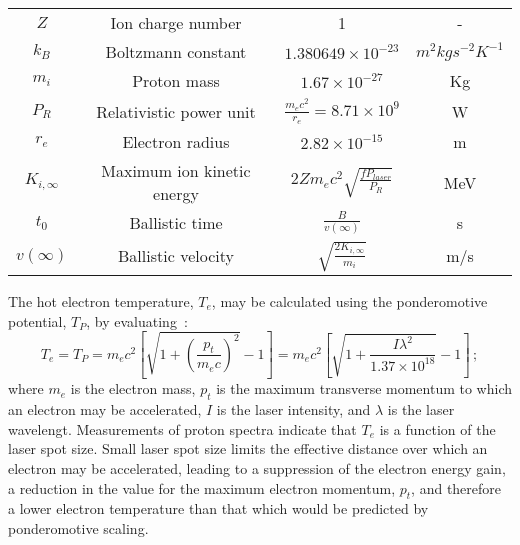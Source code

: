 \begin{table}
\begin{center}
\begin{tabular}{c c c c}
      $Z$ & Ion charge number & 1 & - \\  
      $k_{B}$ & Boltzmann constant & $1.380649 \times 10^{-23}$ & $m^{2} kg s^{-2} K^{-1}$ \\  
      $m_{i}$ & Proton mass & $1.67 \times 10^{-27}$ & Kg \\ 
      $P_{R}$ & Relativistic power unit & $\frac{m_{e} c^{2}}{r_{e}} = 8.71 \times 10^{9}$ & W \\  
      $r_{e}$ & Electron radius & $2.82 \times 10^{-15}$ & m \\  
      $K_{i,\infty}$ & Maximum ion kinetic energy & $2 Z m_{e} c^{2} \sqrt{\frac{f P_{laser}}{P_{R}}}$ & MeV \\  
      $t_{0}$ & Ballistic time & $\frac{B}{v(\infty)}$ & s \\  
      $v(\infty)$ & Ballistic velocity & $\sqrt{\frac{2 K_{i,\infty}}{m_{i}}}$ & m/s \\  
      \hline
    \end{tabular}
  \end{center}
\end{table}

The hot electron temperature, $T_e$, may be calculated using the 
ponderomotive potential, $T_P$, by
evaluating~\cite{10.1038/nphys199}: 
\begin{equation}
  T_e = T_P = m_{e} c^{2}
                \left[
                  \sqrt{1 + \left(\frac{p_t}{m_e c}\right)^2} - 1
                \right]
            = m_{e} c^{2}
                \left[
                  \sqrt{1 + \frac{I \lambda^{2}}{1.37 \times 10^{18}}} - 1
                \right]
            \, ;
  \label{Eq:ElectronTemp}
\end{equation}
where $m_e$ is the electron mass, $p_t$ is the maximum transverse
momentum to which an electron may be accelerated, $I$ is the laser
intensity, and $\lambda$ is the laser wavelengt.
Measurements of proton spectra indicate that $T_e$ is a function of
the laser spot size.
Small laser spot size limits the effective distance over which an
electron may be accelerated, leading to a suppression of the electron
energy gain, a reduction in the value for the maximum electron
momentum, $p_t$, and therefore a lower electron temperature than that
which would be predicted by ponderomotive scaling.

